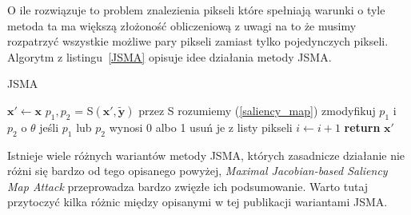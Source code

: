 \documentclass[
    left=2.5cm,         %
    right=2.5cm,        %
    top=2.5cm,          %
    bottom=3cm,         %
    bindingoffset=6mm,  %
    nohyphenation=false %
]{eiti/eiti-thesis}
\renewcommand{\vec}[1]{\mathbf{#1}}
\begin{document}
O ile rozwiązuje to problem znalezienia pikseli które spełniają warunki o tyle metoda ta ma większą złożoność obliczeniową
z uwagi na to że musimy rozpatrzyć wszystkie możliwe pary pikseli zamiast tylko pojedynczych pikseli.
Algorytm z listingu~\ref{JSMA} opisuje idee działania metody JSMA.

\begin{algorithm}[H]
\caption{JSMA}\label{JSMA}
\begin{algorithmic}[1]
\State $\vec{x'} \gets \vec{x}$
\While{$f(\vec{x'}) \neq  \vec{\widetilde{y}}\ \& \ i < i_{max}$}
    \State $p_1, p_2$ = S$(\vec{x'},\vec{\widetilde{y}})$ \Comment przez S rozumiemy (\ref{saliency_map})
    \State zmodyfikuj $p_1$ i $p_2$ o $\theta$
    \State jeśli $p_1$ lub $p_2$ wynosi 0 albo 1 usuń je z listy pikseli
    \State $i \gets i+1$
\EndWhile
\State \textbf{return} $\vec{x'}$
\end{algorithmic}
\end{algorithm}

Istnieje wiele różnych wariantów metody JSMA, których zasadnicze działanie nie różni się bardzo od tego opisanego powyżej,
\textit{Maximal Jacobian-based Saliency Map Attack}\cite{DBLP:journals/corr/abs-1808-07945} przeprowadza bardzo
zwięzłe ich podsumowanie. Warto tutaj przytoczyć kilka różnic między opisanymi w tej publikacji
wariantami JSMA.
\end{document}
